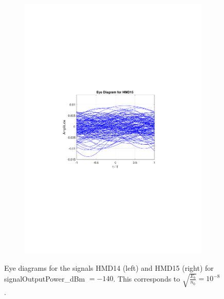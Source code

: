 \begin{figure}
\begin{subfigure}{.5\textwidth}
		\includegraphics[clip, trim=5cm 10cm 5cm 10cm, width=\textwidth]{./sdf/m_qam_system/figures/HMD15_eye_diagram_140.pdf}
	\end{subfigure}
	\caption{Eye diagrams for the signals HMD14 (left) and HMD15 (right) for signalOutputPower\_dBm $=-140$. This corresponds to $\sqrt{\frac{E_b}{n_0}}=10^{-8}$.}
	\label{fig:eye_diagram_140}
\end{figure}

